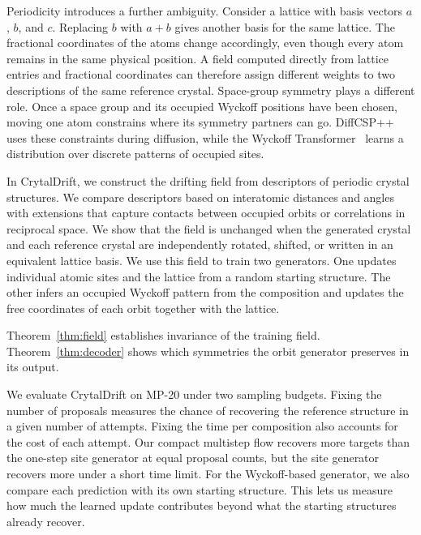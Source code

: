 Periodicity introduces a further ambiguity. Consider a lattice with basis vectors \(a\), \(b\), and \(c\). Replacing \(b\) with \(a+b\) gives another basis for the same lattice. The fractional coordinates of the atoms change accordingly, even though every atom remains in the same physical position. A field computed directly from lattice entries and fractional coordinates can therefore assign different weights to two descriptions of the same reference crystal. Space-group symmetry plays a different role. Once a space group and its occupied Wyckoff positions have been chosen, moving one atom constrains where its symmetry partners can go. DiffCSP++~\cite{diffcspplus} uses these constraints during diffusion, while the Wyckoff Transformer~\cite{wyformer} learns a distribution over discrete patterns of occupied sites.

In CrytalDrift, we construct the drifting field from descriptors of periodic crystal structures. We compare descriptors based on interatomic distances and angles with extensions that capture contacts between occupied orbits or correlations in reciprocal space. We show that the field is unchanged when the generated crystal and each reference crystal are independently rotated, shifted, or written in an equivalent lattice basis. We use this field to train two generators. One updates individual atomic sites and the lattice from a random starting structure. The other infers an occupied Wyckoff pattern from the composition and updates the free coordinates of each orbit together with the lattice.

Theorem~\ref{thm:field} establishes invariance of the training field. Theorem~\ref{thm:decoder} shows which symmetries the orbit generator preserves in its output.

We evaluate CrytalDrift on MP-20 under two sampling budgets. Fixing the number of proposals measures the chance of recovering the reference structure in a given number of attempts. Fixing the time per composition also accounts for the cost of each attempt. Our compact multistep flow recovers more targets than the one-step site generator at equal proposal counts, but the site generator recovers more under a short time limit. For the Wyckoff-based generator, we also compare each prediction with its own starting structure. This lets us measure how much the learned update contributes beyond what the starting structures already recover.
